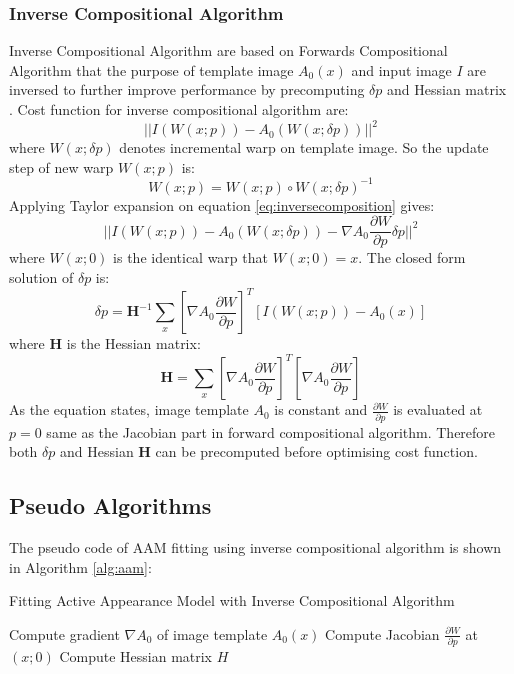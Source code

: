\subsubsection{Inverse Compositional Algorithm}
Inverse Compositional Algorithm are based on Forwards Compositional Algorithm that the purpose of template image $A_0(x)$ and input image $I$ are inversed to further improve performance by precomputing $\delta p$ and Hessian matrix \cite{Matthews2004}. Cost function for inverse compositional algorithm are:
\begin{equation}
\label{eq:inversecomposition}
||I(W(x;p))-A_0(W(x;\delta p))||^2
\end{equation}
where $W(x;\delta p)$ denotes incremental warp on template image. So the update step of new warp $W(x;p)$ is:
\begin{equation}
W(x;p) = W(x;p)\circ W(x;\delta p)^{-1}
\end{equation}
Applying Taylor expansion on equation \ref{eq:inversecomposition} gives:
\begin{equation}
\label{eq:inversecompositiontaylor}
||I(W(x;p))-A_0(W(x;\delta p))-\nabla A_0\frac{\partial W}{\partial p}\delta p||^2
\end{equation}
where $W(x;0)$ is the identical warp that $W(x;0) = x$. The closed form solution of $\delta p$ is:
\begin{equation}
\label{eq:dpic}
\delta p=\bm{H}^{-1}\sum_x[\nabla A_0\frac{\partial W}{\partial p}]^T[I(W(x;p))-A_0(x)]
\end{equation}
where $\bm{H}$ is the Hessian matrix:
\begin{equation}
\label{eq:hessianic}
\bm{H}=\sum_x[\nabla A_0\frac{\partial W}{\partial p}]^T[\nabla A_0\frac{\partial W}{\partial p}]
\end{equation}
As the equation states, image template $A_0$ is constant and $\frac{\partial W}{\partial p}$ is evaluated at $p=0$ same as the Jacobian part in forward compositional algorithm. Therefore both $\delta p$ and Hessian $\bm{H}$ can be precomputed before optimising cost function. 

\subsection{Pseudo Algorithms}

The pseudo code of AAM fitting using inverse compositional algorithm is shown in Algorithm \ref{alg:aam}\cite{Matthews2004}:

\begin{algorithm}[ht]
\caption{Fitting Active Appearance Model with Inverse Compositional Algorithm}
\label{alg:aam}
Compute gradient $\nabla A_0$ of image template $A_0(x)$\;
Compute Jacobian $\frac{\partial W}{\partial p}$ at $(x;0)$\;
Compute Hessian matrix $H$\;
\end{algorithm}


